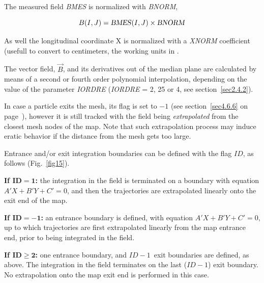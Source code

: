\noindent The measured field \textsl{BMES} is normalized with \textsl{BNORM},

$$ B(I,J) = \text{\textsl{BMES}}(I,J) \times  \text{\textsl{BNORM}} $$

\noindent As well the longitudinal coordinate  X is normalized with 
a  \textsl{XNORM} coefficient (usefull to convert to centimeters, the working units in  \zgoubi. 

\noindent The vector field, $ \vec  B $, and its derivatives out of the median
plane are calculated by means of a second or fourth order polynomial 
interpolation, depending on 
the value of the parameter \textsl{IORDRE} (\textsl{IORDRE} = 2, 25 or 4, 
see section~\ref{sec2.4.2}). 
\bigskip

\noindent In case a particle  exits the mesh, its \IEX{} flag is set to $-1$ (see section~\ref{sec4.6.6} on 
page~\pageref{sec4.6.6}), however it is still tracked with the field being {\it extrapolated} from 
the closest mesh nodes of the map. Note that such extrapolation process may induce eratic behavior if the distance from the mesh gets 
too large. 

\bigskip

\noindent Entrance and/or exit integration boundaries can be defined with 
the flag $ID$, as follows (Fig.~\ref{fig15}).
\bigskip

\noindent \textbf{If  $\mathbf{ID = 1}$:} the integration in the field 
is terminated on a boundary with equation $A'X + B'Y + C'=0 $, and 
then the trajectories are extrapolated linearly onto the exit end of the 
map.
\medskip

\noindent \textbf{If  $\mathbf{ID = -1}$:} an entrance boundary is 
defined, with equation $A'X + B'Y + C'=0 $, up to which  trajectories are 
first extrapolated linearly from the map entrance end, prior to being 
integrated in the field.
\medskip

\noindent \textbf{If  $\mathbf{ID \geq 2}$:} one entrance boundary, and 
$ID-1$~exit boundaries are defined, as above. The integration in the 
field terminates on the last ($ID - 1$) exit boundary. No extrapolation onto 
the map exit end is performed in this case.

\newpage

